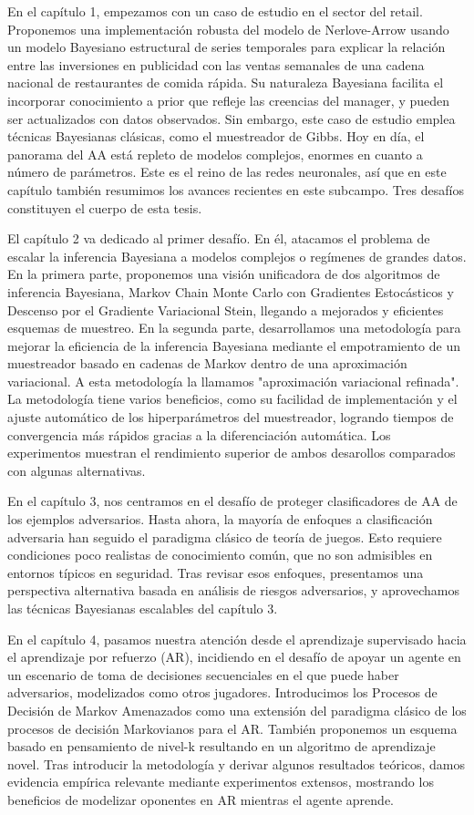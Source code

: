 \documentclass[a4paper, 11pt, openright, twoside]{reportPhD}
\numberwithin{figure}{chapter}
\numberwithin{table}{chapter}
\numberwithin{equation}{chapter}
\begin{document}
En el capítulo 1, empezamos con un caso de estudio en el sector del retail. Proponemos una implementación robusta del modelo de Nerlove-Arrow usando un modelo Bayesiano estructural de series temporales para explicar la relación entre las inversiones en publicidad con las ventas semanales de una cadena nacional de restaurantes de comida rápida. Su naturaleza Bayesiana facilita el incorporar conocimiento a prior que refleje las creencias del manager, y pueden ser actualizados con datos observados. Sin embargo, este caso de estudio emplea técnicas Bayesianas clásicas, como el muestreador de Gibbs. Hoy en día, el panorama del AA está repleto de modelos complejos, enormes en cuanto a número de parámetros. Este es el reino de las redes neuronales, así que en este capítulo también resumimos los avances recientes en este subcampo. Tres desafíos constituyen el cuerpo de esta tesis.

El capítulo 2 va dedicado al primer desafío. En él, atacamos el problema de escalar la inferencia Bayesiana a modelos complejos o regímenes de grandes datos. En la primera parte, proponemos una visión unificadora de dos algoritmos de inferencia Bayesiana, Markov Chain Monte Carlo con Gradientes Estocásticos y Descenso por el Gradiente Variacional Stein, llegando a mejorados y eficientes esquemas de muestreo. En la segunda parte, desarrollamos una metodología para mejorar la eficiencia de la inferencia Bayesiana mediante el empotramiento de un muestreador basado en cadenas de Markov dentro de una aproximación variacional. A esta metodología la llamamos "aproximación variacional refinada". La metodología tiene varios beneficios, como su facilidad de implementación y el ajuste automático de los hiperparámetros del muestreador, logrando tiempos de convergencia más rápidos gracias a la diferenciación automática. Los experimentos muestran el rendimiento superior de ambos desarollos comparados con algunas alternativas.

En el capítulo 3, nos centramos en el desafío de proteger clasificadores de AA de los ejemplos adversarios. Hasta ahora, la mayoría de enfoques a clasificación adversaria han seguido el paradigma clásico de teoría de juegos. Esto requiere condiciones poco realistas de conocimiento común, que no son admisibles en entornos típicos en seguridad. Tras revisar esos enfoques, presentamos una perspectiva alternativa basada en análisis de riesgos adversarios, y aprovechamos las técnicas Bayesianas escalables del capítulo 3.

En el capítulo 4, pasamos nuestra atención desde el aprendizaje supervisado hacia el aprendizaje por refuerzo (AR), incidiendo en el desafío de apoyar un agente en un escenario de toma de decisiones secuenciales en el que puede haber adversarios, modelizados como otros jugadores. Introducimos los Procesos de Decisión de Markov Amenazados como una extensión del paradigma clásico de los procesos de decisión Markovianos para el AR. También proponemos un esquema basado en pensamiento de nivel-k resultando en un algoritmo de aprendizaje novel. Tras introducir la metodología y derivar algunos resultados teóricos, damos evidencia empírica relevante mediante experimentos extensos, mostrando los beneficios de modelizar oponentes en AR mientras el agente aprende.
\end{document}
